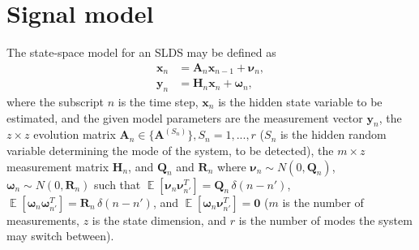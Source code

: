 \documentclass[journal]{IEEEtran}
\DeclareMathOperator{\E}{\mathbb{E}}
\begin{document}
\section{Signal model}\label{section:slds}
The state-space model for an SLDS may be defined as
\begin{align}
    \bm{x}_n &= \bm{A}_n \bm{x}_{n-1}+\bm{\nu}_n, \label{eqn:sp1}\\
    \bm{y}_n &= \bm{H}_n\bm{x}_n +\bm{\omega}_n \label{eqn:sp2},
\end{align}
where the subscript $n$ is the time step, $\bm{x}_n$ is the hidden state variable to be estimated, and the given model parameters are the measurement vector $\bm{y}_n$, the $z\times z$ evolution matrix $\bm{A}_n \in \{ \bm{A}^{(S_n)}\}, S_n=1,...,r$ ($S_n$ is the hidden random variable determining the mode of the system, to be detected), the $m\times z$ measurement matrix $\bm{H}_n$, and $\bm{Q}_n$ and $\bm{R}_n$ where $\bm{\nu}_n \sim N(0,\bm{Q}_n)$, $\bm{\omega}_n \sim N(0,\bm{R}_n)$ such that $\E[\bm{\nu}_n\bm{\nu}_{n'}^T]=\bm{Q}_n\,\delta(n-n')$, $\E[\bm{\omega}_n\bm{\omega}_{n'}^T]=\bm{R}_n\,\delta(n-n')$, and $\E[\bm{\omega}_n\bm{\nu}_{n'}^T]=\bm{0}$ ($m$ is the number of measurements, $z$ is the state dimension, and $r$ is the number of modes the system may switch between). 
\end{document}
